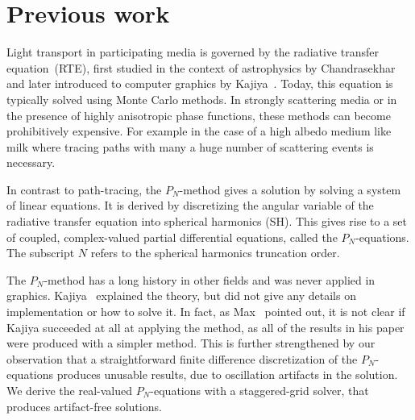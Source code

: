 \section{Previous work}

Light transport in participating media is governed by the radiative transfer equation~(RTE), first studied in the context of astrophysics by Chandrasekhar~\cite{Chandrasekhar60} and later introduced to computer graphics by Kajiya~\cite{Kajiya86}. Today, this equation is typically solved using Monte Carlo methods. In strongly scattering media or in the presence of highly anisotropic phase functions, these methods can become prohibitively expensive. For example in the case of a high albedo medium like milk where tracing paths with many a huge number of scattering events is necessary.


In contrast to path-tracing, the $P_N$-method gives a solution by solving a system of linear equations. It is derived by discretizing the angular variable of the radiative transfer equation into spherical harmonics (SH). This gives rise to a set of coupled, complex-valued partial differential equations, called the $P_N$-equations. The subscript $N$ refers to the spherical harmonics truncation order.

The $P_N$-method has a long history in other fields and was never applied in graphics. Kajiya~\cite{Kajiya84} explained the theory, but did not give any details on implementation or how to solve it. In fact, as Max~\cite{Max95} pointed out, it is not clear if Kajiya succeeded at all at applying the method, as all of the results in his paper were produced with a simpler method. This is further strengthened by our observation that a straightforward finite difference discretization of the $P_N$-equations produces unusable results, due to oscillation artifacts in the solution. We derive the real-valued $P_N$-equations with a staggered-grid solver, that produces artifact-free solutions.

